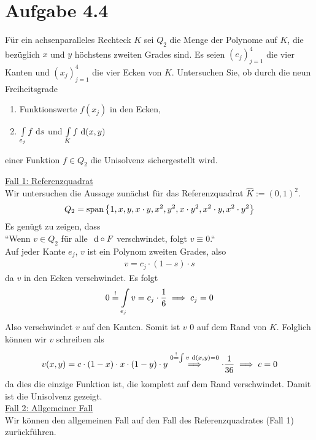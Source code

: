 \documentclass[12pt,a4paper]{article}
\begin{document}
\section*{Aufgabe 4.4}
Für ein achsenparalleles Rechteck $K$ sei $Q_2$ die Menge der Polynome auf $K$, die bezüglich $x$ und $y$ höchstens zweiten Grades sind. Es seien $(e_j)_{j=1}^4$ die vier Kanten und $(x_j)_{j=1}^4$ die vier Ecken von $K$. Untersuchen Sie, ob durch die neun Freiheitsgrade
\begin{enumerate}[label=(\roman*)]
\item Funktionswerte $f(x_j)$ in den Ecken,
\item $\int\limits_{e_j} f\text{ d} s$ und $\int\limits_K f\text{ d}(x,y)$
\end{enumerate}
einer Funktion $f\in Q_2$ die Unisolvenz sichergestellt wird.

\begin{lösung}
\underline{Fall 1: Referenzquadrat}\\
Wir untersuchen die Aussage zunächst für das Referenzquadrat $\hat{K}:=(0,1)^2$.
\begin{align*}
Q_2=\text{span}\left\lbrace 1,x,y,x\cdot y,x^2,y^2,x\cdot y^2,x^2\cdot y,x^2\cdot y^2\right\rbrace
\end{align*}
Es genügt zu zeigen, dass\\
``Wenn $v\in Q_2$ für alle $\text{ d}\circ F$ verschwindet, folgt $v\equiv0$.``\\
Auf jeder Kante $e_j$, $v$ ist ein Polynom zweiten Grades, also
\begin{align*}
v=c_j\cdot(1-s)\cdot s
\end{align*}
da $v$ in den Ecken verschwindet. Es folgt
\begin{align*}
0\stackrel{!}{=}\int\limits_{e_j} v=c_j\cdot\frac{1}{6}\implies c_j=0
\end{align*}
Also verschwindet $v$ auf den Kanten. Somit ist $v$ 0 auf dem Rand von $K$. Folglich können wir $v$ schreiben als
\begin{align*}
v(x,y)=c\cdot(1-x)\cdot x\cdot(1-y)\cdot y
\stackrel{0\stackrel{!}{=}\int v\text{ d} (x,y)=0}{\implies}\cdot\frac{1}{36}\implies c=0
\end{align*}
da dies die einzige Funktion ist, die komplett auf dem Rand verschwindet. Damit ist die Unisolvenz gezeigt.\\

\underline{Fall 2: Allgemeiner Fall}\\
Wir können den allgemeinen Fall auf den Fall des Referenzquadrates (Fall 1) zurückführen.

\end{lösung}
\end{document}

